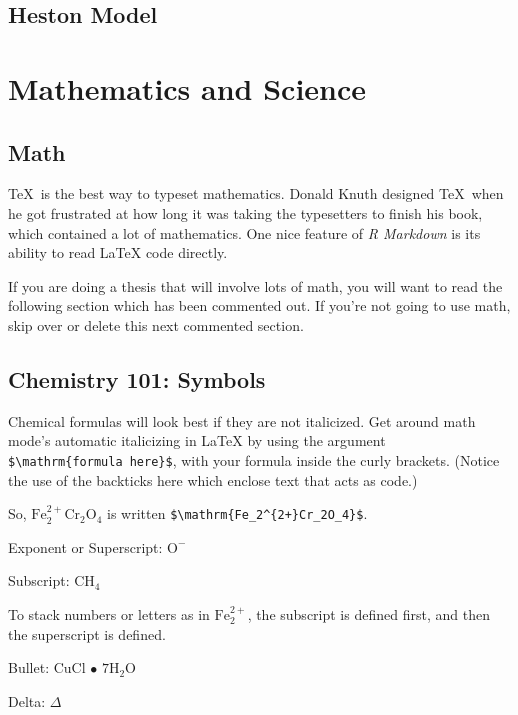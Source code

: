 \documentclass[12pt,twoside]{reedthesis}
\theoremstyle{definition}
\theoremstyle{definition}
\theoremstyle{remark}
\begin{document}
  \section{Heston Model}\label{heston-model}
  
  \chapter{Mathematics and Science}\label{math-sci}
  
  \section{Math}\label{math}
  
  \TeX~is the best way to typeset mathematics. Donald Knuth designed
  \TeX~when he got frustrated at how long it was taking the typesetters to
  finish his book, which contained a lot of mathematics. One nice feature
  of \emph{R Markdown} is its ability to read LaTeX code directly.
  
  If you are doing a thesis that will involve lots of math, you will want
  to read the following section which has been commented out. If you're
  not going to use math, skip over or delete this next commented section.
  
  \section{Chemistry 101: Symbols}\label{chemistry-101-symbols}
  
  Chemical formulas will look best if they are not italicized. Get around
  math mode's automatic italicizing in LaTeX by using the argument
  \texttt{\$\textbackslash{}mathrm\{formula\ here\}\$}, with your formula
  inside the curly brackets. (Notice the use of the backticks here which
  enclose text that acts as code.)
  
  So, \(\mathrm{Fe_2^{2+}Cr_2O_4}\) is written
  \texttt{\$\textbackslash{}mathrm\{Fe\_2\^{}\{2+\}Cr\_2O\_4\}\$}.
  
  \noindent Exponent or Superscript: \(\mathrm{O^-}\)
  
  \noindent Subscript: \(\mathrm{CH_4}\)
  
  To stack numbers or letters as in \(\mathrm{Fe_2^{2+}}\), the subscript
  is defined first, and then the superscript is defined.
  
  \noindent Bullet: CuCl \(\bullet\) \(\mathrm{7H_{2}O}\)
  
  \noindent Delta: \(\Delta\)
  
\end{document}
